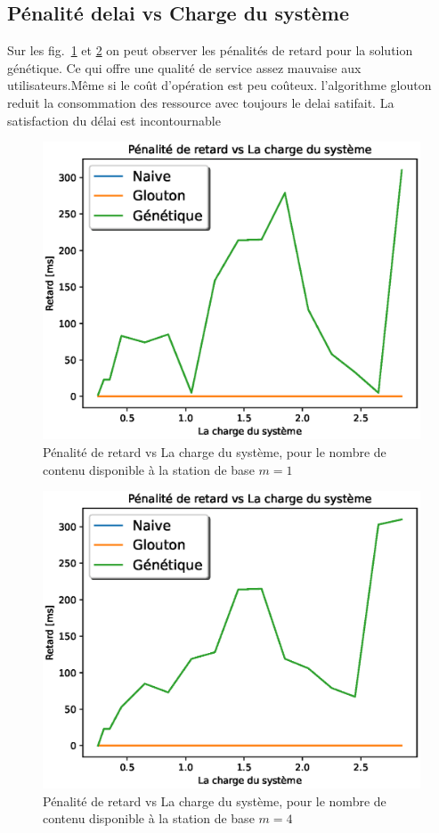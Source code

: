 \documentclass[runningheads]{llncs}
\begin{document}
\subsection{Pénalité delai vs Charge du syst\`eme}
Sur les fig.~\ref{fig:dvslm1} et \ref{fig:dvslm4} on peut observer les pénalités 
de retard pour la solution génétique. 
Ce qui offre une qualité de service assez mauvaise aux utilisateurs.Même si le 
coût d'opération est peu coûteux. 
l'algorithme glouton reduit la consommation des ressource avec toujours le delai satifait.
La satisfaction du délai est incontournable
\begin{figure}[H]
    \includegraphics[width=\textwidth]{DvsL1.eps}
    \caption{Pénalité de retard vs La charge du système, pour 
    le nombre de contenu disponible \`a la station de base $m=1$ } 
    \label{fig:dvslm1}
\end{figure}
\begin{figure}[H]
    \includegraphics[width=\textwidth]{DvsL4.eps}
    \caption{Pénalité de retard vs La charge du système, pour 
    le nombre de contenu disponible \`a la station de base $m=4$ } 
    \label{fig:dvslm4}
\end{figure}
\end{document}
